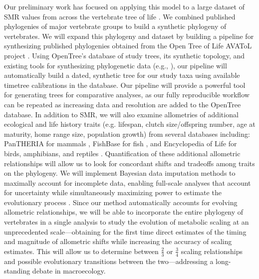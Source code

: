 \documentclass[10pt, a4paper]{article}
\begin{document}
Our preliminary work has focused on applying this model to a large dataset of SMR values from across the vertebrate tree of life \cite{White2006}. We combined published phylogenies of major vertebrate groups \cite{BinindaEmonds2007, PyronWiens2011, Jetz2012, Pyron2013, Rabosky2013} to build a synthetic phylogeny of vertebrates. We will expand this phylogeny and dataset by building a pipeline for synthesizing published phylogenies obtained from the Open Tree of Life AVAToL project \cite{Cranston2014}. Using OpenTree’s database of study trees, its synthetic topology, and existing tools for synthesizing phylogenetic data (e.g., \cite{Eastman2013}), our pipeline will automatically build a dated, synthetic tree for our study taxa using available timetree calibrations in the database. Our pipeline will provide a powerful tool for generating trees for comparative analyses, as our fully reproducible workflow can be repeated as increasing data and resolution are added to the OpenTree database. In addition to SMR, we will also examine allometries of additional ecological and life history traits (e.g. lifespan, clutch size/offspring number, age at maturity, home range size, population growth) from several databases including:  PanTHERIA for mammals \cite{Jones2009}, FishBase for fish \cite{Froese2000}, and Encyclopedia of Life for birds, amphibians, and reptiles \cite{Parr2014}. Quantification of these additional allometric relationships will allow us to look for concordant shifts and tradeoffs among traits on the phylogeny. We will implement Bayesian data imputation methods to maximally account for incomplete data, enabling full-scale analyses that account for uncertainty while simultaneously maximizing power to estimate the evolutionary process \cite{Rubin1987, NakagawaFreckleton2008, NakagawaFreckleton2011}. Since our method automatically accounts for evolving allometric relationships, we will be able to incorporate the entire phylogeny of vertebrates in a single analysis to study the evolution of metabolic scaling at an unprecedented scale---obtaining for the first time direct estimates of the timing and magnitude of allometric shifts while increasing the accuracy of scaling estimates. This will allow us to determine between $\frac{2}{3}$ or $\frac{3}{4}$ scaling relationships and possible evolutionary transitions between the two---addressing a long-standing debate in macroecology.  \
\end{document}
